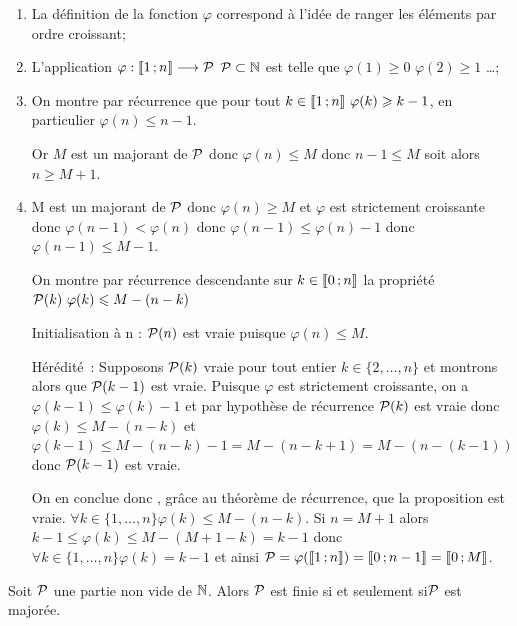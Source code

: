 \begin{enumerate}
  \item La définition de la fonction \(\varphi\) correspond à l'idée de
    ranger les éléments par ordre croissant;
  \item L'application \(\fonctionR{\varphi}{\intervalleentier{1}{n}}{\P}\)
    \(\P \subset \N\) est telle que \(\varphi(1)\geqslant 0\)
    \(\varphi(2)\geqslant 1\) \ldots;
  \item On montre par récurrence que pour tout \(k\in\intervalleentier{1}{n}
    \ \varphi(k)\geqslant k - 1\), en particulier \(\varphi(n)\leqslant n -
    1\).

    Or \(M\) est un majorant de \(\P\) donc \(\varphi(n)\leqslant M\) donc
    \(n - 1\leqslant M\) soit alors \(n\geqslant M + 1\).
  \item M est un majorant de \(\P\) donc \(\varphi(n)\geqslant M\) et
    \(\varphi\) est strictement croissante donc \(\varphi(n -
    1)<\varphi(n)\) donc \(\varphi(n - 1)\leqslant\varphi(n)-1\) donc
    \(\varphi(n - 1)\leqslant M - 1\).

    On montre par récurrence descendante sur \(k\in\intervalleentier{0}{n}\)
    la propriété \(\P(k) \ \varphi(k)\leqslant M - (n - k)\)

    Initialisation à n : \(\P(n)\) est vraie puisque \(\varphi(n)\leqslant
    M\).

    Hérédité~: Supposons \(\P(k)\) vraie pour tout entier \(k\in\{2, \ldots,
    n\}\) et montrons alors que \(\P(k - 1)\) est vraie. Puisque \(\varphi\)
    est strictement croissante, on a \(\varphi(k - 1)\leqslant
    \varphi(k)-1\) et par hypothèse de récurrence \(\P(k)\) est vraie donc
    \(\varphi(k)\leqslant M - (n - k)\) et \(\varphi(k - 1)\leqslant M - (n
    - k)-1 = M - (n - k + 1) = M - (n - (k - 1))\) donc \(\P(k - 1)\) est
    vraie.

    On en conclue donc , grâce au théorème de récurrence, que la proposition
    est vraie. \(\forall k \in \{1, \ldots, n\} \varphi(k)\leqslant M - (n -
    k)\). Si \(n = M + 1\) alors \(k - 1\leqslant \varphi(k)\leqslant M - (M
    + 1 - k) = k - 1\) donc \(\forall k \in \{1, \ldots, n\} \varphi(k) = k
    - 1\) et ainsi \(\P = \varphi(\intervalleentier{1}{n}) =
    \intervalleentier{0}{n - 1}= \intervalleentier{0}{M}\).
\end{enumerate}

\begin{prop}
  Soit \(\P\) une partie non vide de \(\N\). Alors \(\P\) est finie si et
  seulement si\(\P\) est majorée.
\end{prop}

